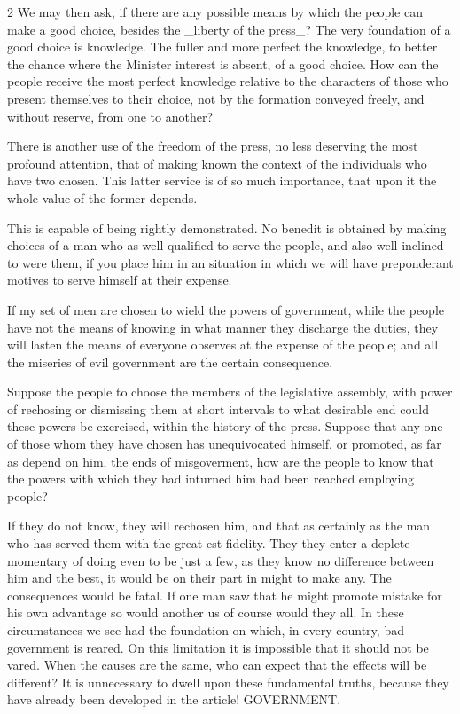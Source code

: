 \documentclass[10pt]{article}
\begin{document}
\begin{multicols}{2}\raggedcolumns
We may then ask, if there are any possible means by which the people can make a good choice, besides the \_liberty of the press\_? The very foundation of a good choice is knowledge. The fuller and more perfect the knowledge, to better the chance where the Minister interest is absent, of a good choice. How can the people receive the most perfect knowledge relative to the characters of those who present themselves to their choice, not by the formation conveyed freely, and without reserve, from one to another?

There is another use of the freedom of the press, no less deserving the most profound attention, that of making known the context of the individuals who have two chosen. This latter service is of so much importance, that upon it the whole value of the former depends.

This is capable of being rightly demonstrated. No benedit is obtained by making choices of a man who as well qualified to serve the people, and also well inclined to were them, if you place him in an situation in which we will have preponderant motives to serve himself at their expense.

If my set of men are chosen to wield the powers of government, while the people have not the means of knowing in what manner they discharge the duties, they will lasten the means of everyone observes at the expense of the people; and all the miseries of evil government are the certain consequence.

Suppose the people to choose the members of the legislative assembly, with power of rechosing or dismissing them at short intervals to what desirable end could these powers be exercised, within the history of the press. Suppose that any one of those whom they have chosen has unequivocated himself, or promoted, as far as depend on him, the ends of misgoverment, how are the people to know that the powers with which they had inturned him had been reached employing people?

If they do not know, they will rechosen him, and that as certainly as the man who has served them with the great est fidelity. They they enter a deplete momentary of doing even to be just a few, as they know no difference between him and the best, it would be on their part in might to make any. The consequences would be fatal. If one man saw that he might promote mistake for his own advantage so would another us of course would they all. In these circumstances we see had the foundation on which, in every country, bad government is reared. On this limitation it is impossible that it should not be vared. When the causes are the same, who can expect that the effects will be different? It is unnecessary to dwell upon these fundamental truths, because they have already been developed in the article! GOVERNMENT.


\end{multicols}
\end{document}
